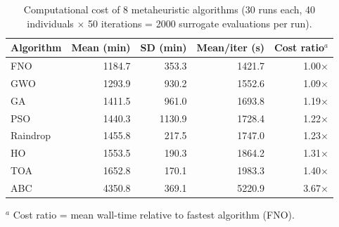 \begin{table}[h]
\centering
\caption{Computational cost of 8 metaheuristic algorithms (30 runs each, 40 individuals $\times$ 50 iterations = 2000 surrogate evaluations per run).}
\label{tab:timing}
\begin{tabular}{lrrrr}
\toprule
Algorithm & Mean (min) & SD (min) & Mean/iter (s) & Cost ratio$^a$ \\
\midrule
FNO & 1184.7 & 353.3 & 1421.7 & 1.00$\times$ \\
GWO & 1293.9 & 930.2 & 1552.6 & 1.09$\times$ \\
GA & 1411.5 & 961.0 & 1693.8 & 1.19$\times$ \\
PSO & 1440.3 & 1130.9 & 1728.4 & 1.22$\times$ \\
Raindrop & 1455.8 & 217.5 & 1747.0 & 1.23$\times$ \\
HO & 1553.5 & 190.3 & 1864.2 & 1.31$\times$ \\
TOA & 1652.8 & 170.1 & 1983.3 & 1.40$\times$ \\
ABC & 4350.8 & 369.1 & 5220.9 & 3.67$\times$ \\
\bottomrule
\end{tabular}

$^a$ Cost ratio = mean wall-time relative to fastest algorithm (FNO).
\end{table}
